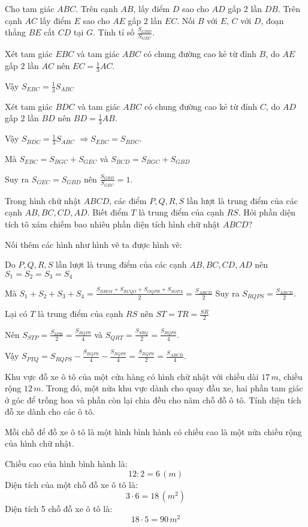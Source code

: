 \begin{bt}
	Cho tam giác $ABC$. Trên cạnh $AB$, lấy điểm $D$ sao cho $AD$ gấp 2 lần $DB$. Trên cạnh $AC$ lấy điểm $E$ sao cho $AE$ gấp 2 lần $EC$. Nối $B$ với $E$, $C$ với $D$, đoạn thẳng $BE$ cắt $CD$ tại $G$. Tính tỉ số  $\frac{S_{GBD}}{S_{GEC}}$.
	\begin{loigiaichuong37}
		Xét tam giác $EBC$ và tam giác $ABC$ có chung đường cao kẻ từ đỉnh $B$, do $AE$ gấp $2$ lần $AC$ nên  $EC=\frac{1}{3}AC.$
		  
		Vậy  ${{S}_{EBC}}=\frac{1}{3}{{S}_{ABC}}$
		    
		Xét tam giác $BDC$ và tam giác $ABC$ có chung đường cao kẻ từ đỉnh $C$, do $AD$ gấp $2$ lần $BD$ nên  $BD=\frac{1}{3}AB.$
		 
		Vậy  ${{S}_{BDC}}=\frac{1}{3}{{S}_{ABC}}$ 
		$\Rightarrow {{S}_{EBC}}={{S}_{BDC}}$.
		 
		Mà  ${{S}_{EBC}}={{S}_{BGC}}+{{S}_{GEC}}$ và  ${{S}_{BCD}}={{S}_{BGC}}+{{S}_{GBD}}$
		 
		Suy ra  ${{S}_{GEC}}={{S}_{GBD}}$  nên  $\frac{{{S}_{GBD}}}{{{S}_{GEC}}}=1$.
	\end{loigiaichuong37}
\end{bt}
\begin{bt}
	Trong hình chữ nhật $ABCD$, các điểm $P,Q,R,S$ lần lượt là trung điểm của các cạnh $AB,BC,CD,AD$. Biết điểm $T$ là trung điểm của cạnh $RS$. Hỏi phần diện tích tô xám chiếm bao nhiêu phần diện tích hình chữ nhật $ABCD$?
	\begin{loigiaichuong37}
		Nối thêm các hình như hình vẽ ta được hình vẽ: 
		
		
		Do $P,Q,R,S$ lần lượt là trung điểm của các cạnh $AB,BC,CD,AD$ nên  ${{S}_{1}}={{S}_{2}}={{S}_{3}}={{S}_{4}}$ 
		
		Mà  ${{S}_{1}}+{{S}_{2}}+{{S}_{3}}+{{S}_{4}}=\frac{{{S}_{DROS}}+{{S}_{RCQO}}+{{S}_{OQPB}}+{{S}_{SOPA}}}{2}=\frac{{{S}_{ABCD}}}{2}$ 
		Suy ra  ${{S}_{RQPS}}=\frac{{{S}_{ABCD}}}{2}$.
		
		Lại có $T$ là trung điểm của cạnh $RS$ nên  $ST=TR=\frac{SR}{2}$ 
		
		Nên  ${{S}_{STP}}=\frac{{{S}_{SPR}}}{2}=\frac{{{S}_{RQPS}}}{4}$  và  ${{S}_{QRT}}=\frac{{{S}_{SRQ}}}{2}=\frac{{{S}_{RQPS}}}{4}$.
		
		Vậy  ${{S}_{PTQ}}={{S}_{RQPS}}-\frac{{{S}_{RQPS}}}{4}-\frac{{{S}_{RQPS}}}{4}=\frac{{{S}_{RQPS}}}{2}=\frac{{{S}_{ABCD}}}{4}$.
	\end{loigiaichuong37}
\end{bt}
\begin{bt}
	Khu vực đỗ xe ô tô của một cửa hàng có hình chữ nhật với chiều dài $17\, m$, chiều rộng $12\, m$. Trong đó, một nửa khu vực dành cho quay đầu xe, hai phần tam giác ở góc để trồng hoa và phần còn lại chia đều cho năm chỗ đỗ ô tô. Tính diện tích đỗ xe dành cho các ô tô.
	\begin{loigiaichuong37}
		Mỗi chỗ để đỗ xe ô tô là một hình bình hành có chiều cao là một nửa chiều rộng của hình chữ nhật.
		
		Chiều cao của hình bình hành là: 
		\[12:2=6 \,(m)\] 
		Diện tích của một chỗ đỗ xe ô tô là: 
		\[3\cdot6=18 \,(m^2)\] 
		Diện tích 5 chỗ đỗ xe ô tô là:
		\[18\cdot5=90 \,m^2\] 
	\end{loigiaichuong37}
\end{bt} 
